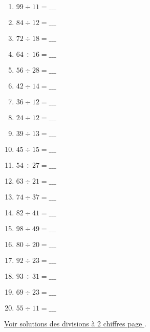 \begin{enumerate}[label=C\arabic*)]
    \item \(99 \div 11 =  \_\_\_\)
    \item \(84 \div 12 = \_\_\_\)
    \item \(72 \div 18 = \_\_\_\)
    \item \(64 \div 16 = \_\_\_\)
    \item \(56 \div 28 = \_\_\_\)
    \item \(42 \div 14 = \_\_\_\)
    \item \(36 \div 12 = \_\_\_\)
    \item \(24 \div 12 = \_\_\_\)
    \item \(39 \div 13 = \_\_\_\)
    \item \(45 \div 15 = \_\_\_\)
    \item \(54 \div 27 =  \_\_\_\)
    \item \(63 \div 21 = \_\_\_\)
    \item \(74 \div 37 = \_\_\_\)
    \item \(82 \div 41 = \_\_\_\)
    \item \(98 \div 49 = \_\_\_\)
    \item \(80 \div 20 = \_\_\_\)
    \item \(92 \div 23 = \_\_\_\)
    \item \(93 \div 31 = \_\_\_\)
    \item \(69 \div 23 = \_\_\_\)
    \item \(55 \div 11 = \_\_\_\)
\end{enumerate}


\hyperref[sol:niveau6]{Voir solutions des divisions à 2 chiffres page \pageref{sol:niveau6}}.

\newpage

